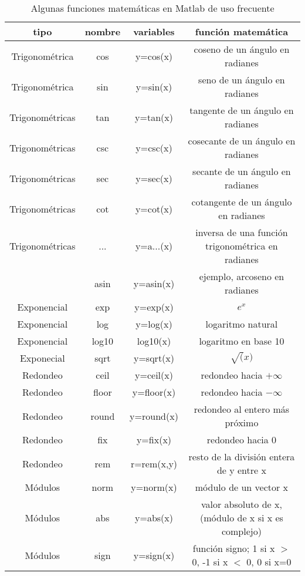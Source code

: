 \begin{table}
\caption{Algunas funciones matemáticas en Matlab de uso frecuente}
\label{tabfun}
\begin{tabular}{c|c|c|c}
tipo&nombre&variables&función matemática\\
\hline
\hline
Trigonométrica&cos&y=cos(x)&coseno de un ángulo en radianes\\
\hline
Trigonométrica&sin&y=sin(x)&seno de un ángulo en radianes\\
\hline
Trigonométricas&tan&y=tan(x)&tangente de un ángulo en radianes\\
\hline
Trigonométricas&csc&y=csc(x)&cosecante de un ángulo en radianes\\
\hline
Trigonométricas&sec&y=sec(x)&secante de un ángulo en radianes\\
\hline
Trigonométricas&cot&y=cot(x)&cotangente de un ángulo en radianes\\

\hline
Trigonométricas&...&y=a...(x)&inversa de una función trigonométrica en radianes\\
&asin&y=asin(x)&ejemplo, arcoseno en radianes\\
\hline
\hline
Exponencial&exp&y=exp(x)&$e^x$\\
\hline
Exponencial&log&y=log(x)&logaritmo natural\\
\hline
Exponencial&log10&log10(x)&logaritmo en base 10\\
\hline
Exponecial&sqrt&y=sqrt(x)&$\sqrt(x)$\\
\hline
\hline
Redondeo&ceil&y=ceil(x)& redondeo hacia $+\infty$\\
\hline
Redondeo&floor&y=floor(x)&redondeo hacia $-\infty$\\
\hline
Redondeo&round&y=round(x)&redondeo al entero más próximo\\
\hline
Redondeo&fix&y=fix(x)&redondeo hacia $0$\\
\hline
Redondeo&rem&r=rem(x,y)&resto de la división entera de y entre x\\
\hline
\hline
Módulos&norm&y=norm(x)& módulo de un vector x\\
\hline
Módulos&abs&y=abs(x)&valor absoluto de x,(módulo de x si x es complejo)\\
\hline
Módulos&sign&y=sign(x)&función signo; 1 si x $>$ 0, -1 si x $<$ 0, 0 si x=0\\
\end{tabular}
\end{table}


